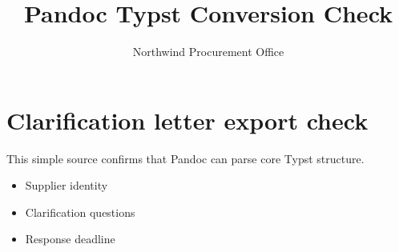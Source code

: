 \documentclass[
]{article}
\title{Pandoc Typst Conversion Check}
\author{Northwind Procurement Office}
\date{}
\begin{document}
\maketitle

\section{Clarification letter export check}

This simple source confirms that Pandoc can parse core Typst structure.

\begin{itemize}
\item
  Supplier identity
\item
  Clarification questions
\item
  Response deadline
\end{itemize}
\end{document}
